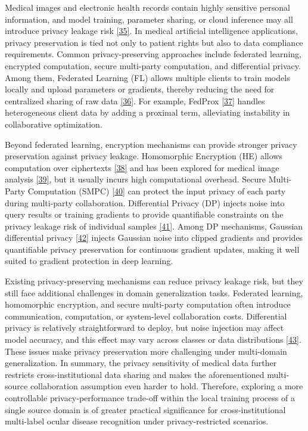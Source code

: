 Medical images and electronic health records contain highly sensitive personal information, and model training, parameter sharing, or cloud inference may all introduce privacy leakage risk \hyperref[_Ref213950358]{{[}35{]}}. In medical artificial intelligence applications, privacy preservation is tied not only to patient rights but also to data compliance requirements. Common privacy-preserving approaches include federated learning, encrypted computation, secure multi-party computation, and differential privacy. Among them, Federated Learning (FL) allows multiple clients to train models locally and upload parameters or gradients, thereby reducing the need for centralized sharing of raw data \hyperref[_Ref213950376]{{[}36{]}}. For example, FedProx \hyperref[_Ref213950391]{{[}37{]}} handles heterogeneous client data by adding a proximal term, alleviating instability in collaborative optimization.

Beyond federated learning, encryption mechanisms can provide stronger privacy preservation against privacy leakage. Homomorphic Encryption (HE) allows computation over ciphertexts \hyperref[_Ref213950427]{{[}38{]}} and has been explored for medical image analysis \hyperref[_Ref213950433]{{[}39{]}}, but it usually incurs high computational overhead. Secure Multi-Party Computation (SMPC) \hyperref[_Ref213950438]{{[}40{]}} can protect the input privacy of each party during multi-party collaboration. Differential Privacy (DP) injects noise into query results or training gradients to provide quantifiable constraints on the privacy leakage risk of individual samples \hyperref[_Ref213950443]{{[}41{]}}. Among DP mechanisms, Gaussian differential privacy \hyperref[_Ref213950449]{{[}42{]}} injects Gaussian noise into clipped gradients and provides quantifiable privacy preservation for continuous gradient updates, making it well suited to gradient protection in deep learning.

Existing privacy-preserving mechanisms can reduce privacy leakage risk, but they still face additional challenges in domain generalization tasks. Federated learning, homomorphic encryption, and secure multi-party computation often introduce communication, computation, or system-level collaboration costs. Differential privacy is relatively straightforward to deploy, but noise injection may affect model accuracy, and this effect may vary across classes or data distributions \hyperref[_Ref213950458]{{[}43{]}}. These issues make privacy preservation more challenging under multi-domain generalization. In summary, the privacy sensitivity of medical data further restricts cross-institutional data sharing and makes the aforementioned multi-source collaboration assumption even harder to hold. Therefore, exploring a more controllable privacy-performance trade-off within the local training process of a single source domain is of greater practical significance for cross-institutional multi-label ocular disease recognition under privacy-restricted scenarios.
